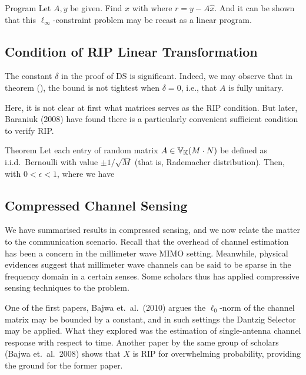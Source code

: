 \Result
{Program}
{
Let \(A,y\) be given.
Find \(x\) with
%
%
where \(r =y -A \hat{x}\).
}
And it can be shown that this \(\ell_\infty\)-constraint problem may be recast as a linear program.

\subsection{Condition of RIP Linear Transformation}

The constant \(\delta\) in the proof of DS is significant.
Indeed, we may observe that in theorem (), the bound is not tightest when \(\delta=0\), i.e., that \(A\) is fully unitary.

Here, it is not clear at first what matrices serves as the RIP condition.
But later, Baraniuk (2008) have found there is a particularly convenient sufficient condition to verify RIP.

\Result
{Theorem}
{
Let each entry of random matrix \(A \in \mathbb{V}_{\mathbb{K}}(M \cdot N)\) be defined as i.i.d.\ Bernoulli with value \(\pm 1/\sqrt{M}\) (that is, Rademacher distribution).
Then, with \(0 <\epsilon <1\),
%
%
where we have
%
%
}

\subsection{Compressed Channel Sensing}

We have summarised results in compressed sensing, and we now relate the matter to the communication scenario.
Recall that the overhead of channel estimation has been a concern in the millimeter wave MIMO setting.
Meanwhile, physical evidences suggest that millimeter wave channels can be said to be sparse in the frequency domain in a certain senses.
Some scholars thus has applied compressive sensing techniques to the problem.

One of the first papers, Bajwa et.\ al.\ (2010) argues the \(\ell_0\)-norm of the channel matrix may be bounded by a constant, and in such settings the Dantzig Selector may be applied.
What they explored was the estimation of single-antenna channel response with respect to time.
Another paper by the same group of scholars (Bajwa et.\ al.\ 2008) shows that \(X\) is RIP for overwhelming probability, providing the ground for the former paper.

